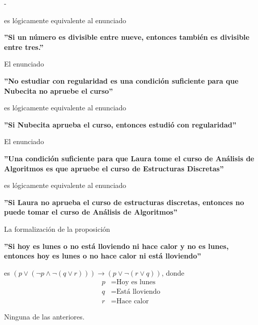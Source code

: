 \documentclass[12pt, a4paper]{exam}
\makeatletter
\renewenvironment{checkboxes}%
   {\setcounter{choice}{0}\list{\checkbox@char}%
      {%
        \settowidth{\leftmargin}{W.\hskip\labelsep\hskip 2.5em}%
        \def\choice{%
          \if@correctchoice
            \color@endgroup \endgroup
          \fi
          \stepcounter{choice}
          \item[\checked@char]
          \do@choice@pageinfo
        } %
        \def\CorrectChoice{%
          \if@correctchoice
            \color@endgroup \endgroup
          \fi
          \ifprintanswers
            \ifhmode \unskip\unskip\unvbox\voidb@x \fi
            \begingroup \color@begingroup \@correctchoicetrue
            \CorrectChoice@Emphasis
            \stepcounter{choice}
            \item[\checked@char]
          \else
            \stepcounter{choice}
            \item[\checked@char]
          \fi
          \do@choice@pageinfo
        } %
        \let\correctchoice\CorrectChoice
        \labelwidth\leftmargin\advance\labelwidth-\labelsep
        \topsep=0pt
        \partopsep=0pt
        \checkboxeshook
      }%
   }%
   {\if@correctchoice \color@endgroup \endgroup \fi \endlist}
\makeatother
\begin{document}
\begin{questions}
\begin{checkboxes}
            es lógicamente equivalente al enunciado 
            \begin{center}
                \textbf{''Si un número es divisible entre nueve, entonces 
                también es divisible entre tres.''}
            \end{center} %

            \choice El enunciado 
            \begin{center}
                \textbf{''No estudiar con regularidad es una 
                condición suficiente para que Nubecita no apruebe el curso''}
            \end{center}

            es lógicamente equivalente al enunciado 
            \begin{center}
                \textbf{''Si Nubecita aprueba el curso, entonces estudió 
                con regularidad''}
            \end{center} %

            \choice El enunciado 
            \begin{center}
                \textbf{''Una condición suficiente para que Laura tome el 
                curso de Análisis de Algoritmos es que apruebe el curso 
                de Estructuras Discretas''}
            \end{center}

            es lógicamente equivalente al enunciado 
            \begin{center}
                \textbf{''Si Laura no aprueba el curso de estructuras 
                discretas, entonces no puede tomar el curso de Análisis de 
                Algoritmos''}
            \end{center}

            \choice La formalización de la proposición
            \begin{center}
                \textbf{''Si hoy es lunes o no está lloviendo ni hace calor y 
                no es lunes, entonces hoy es lunes o no hace calor ni está 
                lloviendo''}
            \end{center}

            es $(p \lor (\neg p \land \neg (q \lor r))) \rightarrow (p \lor 
            \neg (r \lor q))$, donde 
            \begin{align*}
                p &= \text{Hoy es lunes} \\ 
                q &= \text{Está lloviendo} \\ 
                r &= \text{Hace calor}
            \end{align*} %

            \choice Ninguna de las anteriores.
        \end{checkboxes}
    \end{questions}
\end{document}
